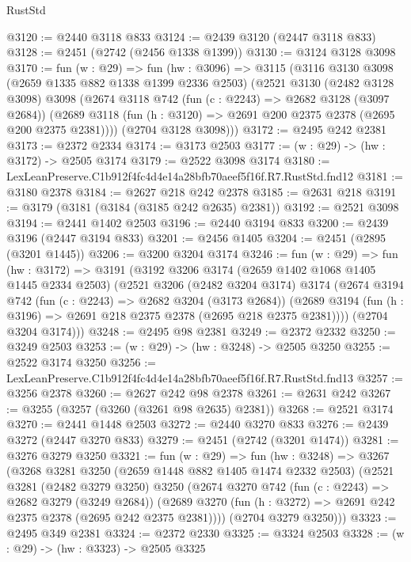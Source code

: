 \begin{lexlean}{RustStd}
\begin{coremodule}
@3120 := @2440 @3118 @833
@3124 := @2439 @3120 (@2447 @3118 @833)
@3128 := @2451 (@2742 (@2456 @1338 @1399))
@3130 := @3124 @3128 @3098
@3170 := fun (w : @29) =>
  fun (hw : @3096) =>
  @3115
    (@3116
      @3130
      @3098
      (@2659 @1335 @882 @1338 @1399 @2336 @2503)
      (@2521
        @3130
        (@2482 @3128 @3098)
        @3098
        (@2674
          @3118
          @742
          (fun (c : @2243) => @2682 @3128 (@3097 @2684))
          (@2689 @3118 (fun (h : @3120) => @2691 @200 @2375 @2378 (@2695 @200 @2375 @2381))))
        (@2704 @3128 @3098)))
@3172 := @2495 @242 @2381
@3173 := @2372 @2334
@3174 := @3173 @2503
@3177 := (w : @29) -> (hw : @3172) -> @2505 @3174
@3179 := @2522 @3098 @3174
@3180 := LexLeanPreserve.C1b912f4fc4d4e14a28bfb70aeef5f16f.R7.RustStd.fnd12
@3181 := @3180 @2378
@3184 := @2627 @218 @242 @2378
@3185 := @2631 @218
@3191 := @3179 (@3181 (@3184 (@3185 @242 @2635) @2381))
@3192 := @2521 @3098
@3194 := @2441 @1402 @2503
@3196 := @2440 @3194 @833
@3200 := @2439 @3196 (@2447 @3194 @833)
@3201 := @2456 @1405
@3204 := @2451 (@2895 (@3201 @1445))
@3206 := @3200 @3204 @3174
@3246 := fun (w : @29) =>
  fun (hw : @3172) =>
  @3191
    (@3192
      @3206
      @3174
      (@2659 @1402 @1068 @1405 @1445 @2334 @2503)
      (@2521
        @3206
        (@2482 @3204 @3174)
        @3174
        (@2674
          @3194
          @742
          (fun (c : @2243) => @2682 @3204 (@3173 @2684))
          (@2689 @3194 (fun (h : @3196) => @2691 @218 @2375 @2378 (@2695 @218 @2375 @2381))))
        (@2704 @3204 @3174)))
@3248 := @2495 @98 @2381
@3249 := @2372 @2332
@3250 := @3249 @2503
@3253 := (w : @29) -> (hw : @3248) -> @2505 @3250
@3255 := @2522 @3174 @3250
@3256 := LexLeanPreserve.C1b912f4fc4d4e14a28bfb70aeef5f16f.R7.RustStd.fnd13
@3257 := @3256 @2378
@3260 := @2627 @242 @98 @2378
@3261 := @2631 @242
@3267 := @3255 (@3257 (@3260 (@3261 @98 @2635) @2381))
@3268 := @2521 @3174
@3270 := @2441 @1448 @2503
@3272 := @2440 @3270 @833
@3276 := @2439 @3272 (@2447 @3270 @833)
@3279 := @2451 (@2742 (@3201 @1474))
@3281 := @3276 @3279 @3250
@3321 := fun (w : @29) =>
  fun (hw : @3248) =>
  @3267
    (@3268
      @3281
      @3250
      (@2659 @1448 @882 @1405 @1474 @2332 @2503)
      (@2521
        @3281
        (@2482 @3279 @3250)
        @3250
        (@2674
          @3270
          @742
          (fun (c : @2243) => @2682 @3279 (@3249 @2684))
          (@2689 @3270 (fun (h : @3272) => @2691 @242 @2375 @2378 (@2695 @242 @2375 @2381))))
        (@2704 @3279 @3250)))
@3323 := @2495 @349 @2381
@3324 := @2372 @2330
@3325 := @3324 @2503
@3328 := (w : @29) -> (hw : @3323) -> @2505 @3325

\end{coremodule}
\end{lexlean}
